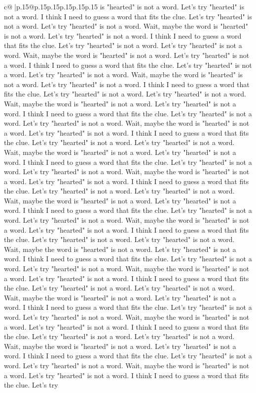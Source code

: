 \documentclass{article}
\begin{document}
{\begin{supertabular}{c@{$\;$}|p{.15\linewidth}@{}p{.15\linewidth}p{.15\linewidth}p{.15\linewidth}p{.15\linewidth}p{.15\linewidth}}
{{{is "hearted" is not a word. Let's try "hearted" is not a word. I think I need to guess a word that fits the clue. Let's try "hearted" is not a word. Let's try "hearted" is not a word. Wait, maybe the word is "hearted" is not a word. Let's try "hearted" is not a word. I think I need to guess a word that fits the clue. Let's try "hearted" is not a word. Let's try "hearted" is not a word. Wait, maybe the word is "hearted" is not a word. Let's try "hearted" is not a word. I think I need to guess a word that fits the clue. Let's try "hearted" is not a word. Let's try "hearted" is not a word. Wait, maybe the word is "hearted" is not a word. Let's try "hearted" is not a word. I think I need to guess a word that fits the clue. Let's try "hearted" is not a word. Let's try "hearted" is not a word. Wait, maybe the word is "hearted" is not a word. Let's try "hearted" is not a word. I think I need to guess a word that fits the clue. Let's try "hearted" is not a word. Let's try "hearted" is not a word. Wait, maybe the word is "hearted" is not a word. Let's try "hearted" is not a word. I think I need to guess a word that fits the clue. Let's try "hearted" is not a word. Let's try "hearted" is not a word. Wait, maybe the word is "hearted" is not a word. Let's try "hearted" is not a word. I think I need to guess a word that fits the clue. Let's try "hearted" is not a word. Let's try "hearted" is not a word. Wait, maybe the word is "hearted" is not a word. Let's try "hearted" is not a word. I think I need to guess a word that fits the clue. Let's try "hearted" is not a word. Let's try "hearted" is not a word. Wait, maybe the word is "hearted" is not a word. Let's try "hearted" is not a word. I think I need to guess a word that fits the clue. Let's try "hearted" is not a word. Let's try "hearted" is not a word. Wait, maybe the word is "hearted" is not a word. Let's try "hearted" is not a word. I think I need to guess a word that fits the clue. Let's try "hearted" is not a word. Let's try "hearted" is not a word. Wait, maybe the word is "hearted" is not a word. Let's try "hearted" is not a word. I think I need to guess a word that fits the clue. Let's try "hearted" is not a word. Let's try "hearted" is not a word. Wait, maybe the word is "hearted" is not a word. Let's try "hearted" is not a word. I think I need to guess a word that fits the clue. Let's try "hearted" is not a word. Let's try "hearted" is not a word. Wait, maybe the word is "hearted" is not a word. Let's try "hearted" is not a word. I think I need to guess a word that fits the clue. Let's try "hearted" is not a word. Let's try "hearted" is not a word. Wait, maybe the word is "hearted" is not a word. Let's try "hearted" is not a word. I think I need to guess a word that fits the clue. Let's try "hearted" is not a word. Let's try "hearted" is not a word. Wait, maybe the word is "hearted" is not a word. Let's try "hearted" is not a word. I think I need to guess a word that fits the clue. Let's try "hearted" is not a word. Let's try "hearted" is not a word. Wait, maybe the word is "hearted" is not a word. Let's try "hearted" is not a word. I think I need to guess a word that fits the clue. Let's try }}}
\end{supertabular}}
\end{document}
